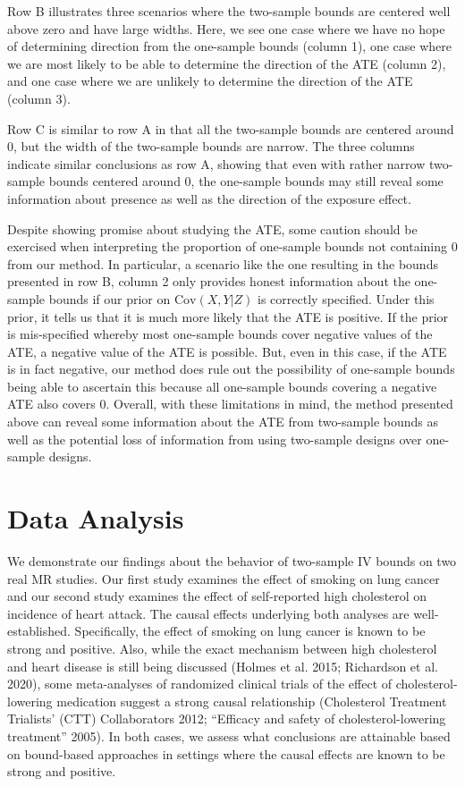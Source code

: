 \documentclass[
]{article}
\theoremstyle{plain}
\begin{document}
Row B illustrates three scenarios where the two-sample bounds are centered well above zero and have large widths. Here, we see one case where we have no hope of determining direction from the one-sample bounds (column 1), one case where we are most likely to be able to determine the direction of the ATE (column 2), and one case where we are unlikely to determine the direction of the ATE (column 3).

Row C is similar to row A in that all the two-sample bounds are centered around 0, but the width of the two-sample bounds are narrow. The three columns indicate similar conclusions as row A, showing that even with rather narrow two-sample bounds centered around 0, the one-sample bounds may still reveal some information about presence as well as the direction of the exposure effect.

Despite showing promise about studying the ATE, some caution should be exercised when interpreting the proportion of one-sample bounds not containing \(0\) from our method. In particular, a scenario like the one resulting in the bounds presented in row B, column 2 only provides honest information about the one-sample bounds if our prior on \(\text{Cov}(X,Y|Z)\) is correctly specified. Under this prior, it tells us that it is much more likely that the ATE is positive. If the prior is mis-specified whereby most one-sample bounds cover negative values of the ATE, a negative value of the ATE is possible. But, even in this case, if the ATE is in fact negative, our method does rule out the possibility of one-sample bounds being able to ascertain this because all one-sample bounds covering a negative ATE also covers \(0\). Overall, with these limitations in mind, the method presented above can reveal some information about the ATE from two-sample bounds as well as the potential loss of information from using two-sample designs over one-sample designs.

\hypertarget{data-analysis}{%
\section{Data Analysis}\label{data-analysis}}

We demonstrate our findings about the behavior of two-sample IV bounds on two real MR studies. Our first study examines the effect of smoking on lung cancer and our second study examines the effect of self-reported high cholesterol on incidence of heart attack. The causal effects underlying both analyses are well-established. Specifically, the effect of smoking on lung cancer is known to be strong and positive. Also, while the exact mechanism between high cholesterol and heart disease is still being discussed (Holmes et al. 2015; Richardson et al. 2020), some meta-analyses of randomized clinical trials of the effect of cholesterol-lowering medication suggest a strong causal relationship (Cholesterol Treatment Trialists' (CTT) Collaborators 2012; ``Efficacy and safety of cholesterol-lowering treatment'' 2005). In both cases, we assess what conclusions are attainable based on bound-based approaches in settings where the causal effects are known to be strong and positive.
\end{document}
